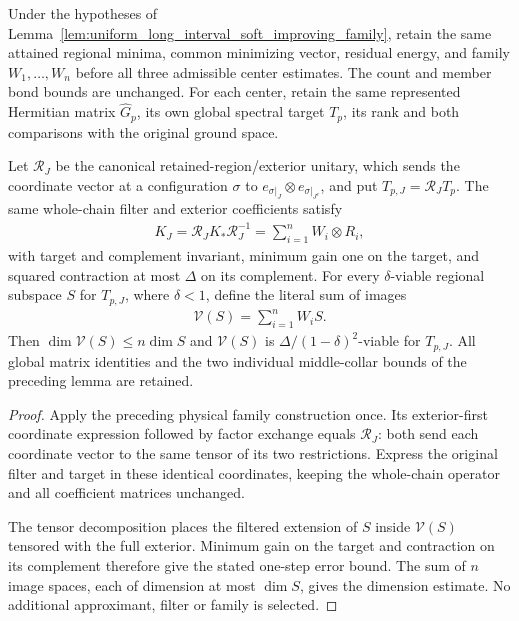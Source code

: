 \begin{lemma}
    \label{lem:uniform_native_long_interval_soft_improving_family}
    \leanok
    Under the hypotheses of
    Lemma~\ref{lem:uniform_long_interval_soft_improving_family}, retain
    the same attained regional minima, common minimizing vector,
    residual energy, and family $W_1,\ldots,W_n$ before all three
    admissible center estimates. The count and member bond bounds
    are unchanged. For each center, retain the same represented
    Hermitian matrix $\widehat G_p$, its own global spectral target
    $T_p$, its rank and both comparisons with the original ground space.

    Let $\mathcal R_J$ be the canonical retained-region/exterior unitary,
    which sends the coordinate vector at a configuration $\sigma$ to
    $e_{\sigma|_J}\otimes e_{\sigma|_{J^c}}$, and put
    $T_{p,J}=\mathcal R_JT_p$.
    The same whole-chain filter and exterior coefficients satisfy
    \begin{align}
        K_J=\mathcal R_JK_*\mathcal R_J^{-1}
        =\sum_{i=1}^n W_i\otimes R_i,
    \end{align}
    with target and complement invariant, minimum gain one on the
    target, and squared contraction at most $\Delta$ on its complement.
    For every $\delta$-viable regional subspace $S$ for $T_{p,J}$,
    where $\delta<1$, define the literal sum of images
    \begin{align}
        \mathcal V(S)=\sum_{i=1}^n W_iS.
    \end{align}
    Then $\dim\mathcal V(S)\le n\dim S$ and
    $\mathcal V(S)$ is $\Delta/(1-\delta)^2$-viable for $T_{p,J}$.
    All global matrix identities and the two individual middle-collar
    bounds of the preceding lemma are retained.
\end{lemma}
\begin{proof}\leanok
    Apply the preceding physical family construction once.
    Its exterior-first coordinate expression followed by factor
    exchange equals $\mathcal R_J$: both send each coordinate vector
    to the same tensor of its two restrictions. Express the original
    filter and target in these identical coordinates, keeping the
    whole-chain operator and all coefficient matrices unchanged.

    The tensor decomposition places the filtered extension of $S$
    inside $\mathcal V(S)$ tensored with the full exterior.
    Minimum gain on the target and contraction on its complement
    therefore give the stated one-step error bound. The sum of $n$
    image spaces, each of dimension at most $\dim S$, gives the
    dimension estimate. No additional approximant, filter or family
    is selected.
\end{proof}

